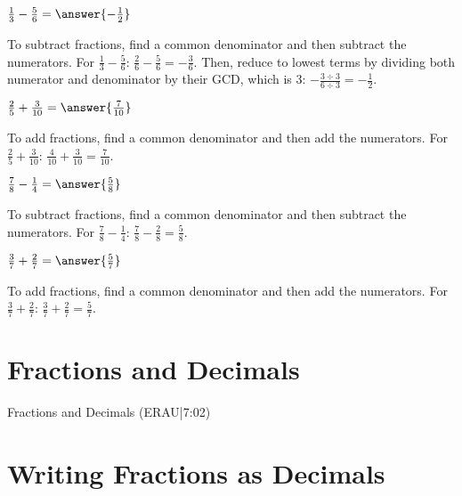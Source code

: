 \documentclass{ximera}
\begin{document}
\begin{problem}
$\frac{1}{3} - \frac{5}{6} = \answer{-\frac{1}{2}}$
\begin{feedback}
To subtract fractions, find a common denominator and then subtract the numerators. For $\frac{1}{3} - \frac{5}{6}$: $\frac{2}{6} - \frac{5}{6} = -\frac{3}{6}$. Then, reduce to lowest terms by dividing both numerator and denominator by their GCD, which is $3$: $-\frac{3 \div 3}{6 \div 3} = -\frac{1}{2}$.
\end{feedback}
\end{problem}

\begin{problem}
$\frac{2}{5} + \frac{3}{10} = \answer{\frac{7}{10}}$
\begin{feedback}
To add fractions, find a common denominator and then add the numerators. For $\frac{2}{5} + \frac{3}{10}$: $\frac{4}{10} + \frac{3}{10} = \frac{7}{10}$.
\end{feedback}
\end{problem}

\begin{problem}
$\frac{7}{8} - \frac{1}{4} = \answer{\frac{5}{8}}$
\begin{feedback}
To subtract fractions, find a common denominator and then subtract the numerators. For $\frac{7}{8} - \frac{1}{4}$: $\frac{7}{8} - \frac{2}{8} = \frac{5}{8}$.
\end{feedback}
\end{problem}

\begin{problem}
$\frac{3}{7} + \frac{2}{7} = \answer{\frac{5}{7}}$
\begin{feedback}
To add fractions, find a common denominator and then add the numerators. For $\frac{3}{7} + \frac{2}{7}$: $\frac{3}{7} + \frac{2}{7} = \frac{5}{7}$.
\end{feedback}
\end{problem}


\section*{Fractions and Decimals}

Fractions and Decimals (ERAU|7:02)


\section*{Writing Fractions as Decimals}
\end{document}
